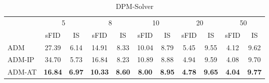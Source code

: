 \begin{table}[!t]
\begin{subtable}[h]{\textwidth}
{        \begin{tabular}{l c c c c c c c c c c}
        \toprule
         & \multicolumn{2}{c}{5} & \multicolumn{2}{c}{8} & \multicolumn{2}{c}{10} & \multicolumn{2}{c}{20} & \multicolumn{2}{c}{50} \\
         & sFID & IS & sFID & IS & sFID & IS & sFID & IS & sFID & IS \\
        \midrule
         ADM & 27.39 & 6.14 & 14.91 & 8.33 & 10.04 & 8.79 & 5.45 & 9.55 & 4.12 & 9.62  \\
         ADM-IP & 34.70 & 5.73 & 16.84 & 8.23 & 10.89 & 8.88 & 4.94 & 9.59 & 4.08 & 9.70 \\
         ADM-AT & \bf 16.84 & \bf 6.97 & \bf 10.33 & \bf 8.60 & \bf 8.00 & \bf 8.95 & \bf 4.78 & \bf 9.65 & \bf 4.04 & \bf 9.77 \\
        \bottomrule
       \end{tabular}
       }
    \end{subtable}
    \begin{subtable}[h]{\textwidth}
        \centering
        \caption{DPM-Solver}
    \end{subtable}
    \label{tab:sfid_is_c10}
\end{table}